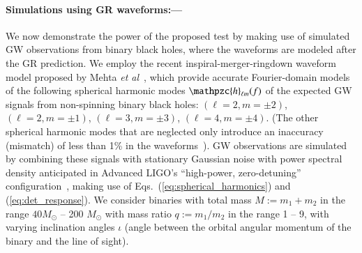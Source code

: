 \documentclass[prl,preprintnumbers,twocolumn,eqsecnum,floatfix,a4paper,nofootinbib,superscriptaddress]{revtex4}
\newcommand{\h}{\mathpzc{h}}
\newcommand{\etal}{\emph{et al}}
\begin{document}
\paragraph{Simulations using GR waveforms:---}
We now demonstrate the power of the proposed test by making use of simulated GW observations from binary black holes, where the waveforms are modeled after the GR prediction. We employ the recent inspiral-merger-ringdown waveform model proposed by Mehta \etal~\cite{Mehta:2017jpq}, which provide accurate Fourier-domain models of the following spherical harmonic modes $\h_{\ell m}(f)$ of the expected GW signals from non-spinning binary black holes: $(\ell = 2, m = \pm2)$, $(\ell = 2, m=\pm1)$, $(\ell = 3, m=\pm3)$, $(\ell = 4, m = \pm4)$. (The other spherical harmonic modes that are neglected only introduce an inaccuracy (mismatch) of less than 1\% in the waveforms~\cite{Mehta:2017jpq}). GW observations are simulated by combining these signals with stationary Gaussian noise with power spectral density anticipated in Advanced LIGO's ``high-power, zero-detuning'' configuration~\cite{aLIGOZeroDetHighPower}, making use of Eqs.~(\ref{eq:spherical_harmonics}) and (\ref{eq:det_response}). We consider binaries with total mass $M := m_1 + m_2$ in the range $40 M_\odot$ -- 200 $M_\odot$ with mass ratio $q := m_1/m_2$ in the range 1 -- 9, with varying inclination angles $\iota$ (angle between the orbital angular momentum of the binary and the line of sight). 
\end{document}
